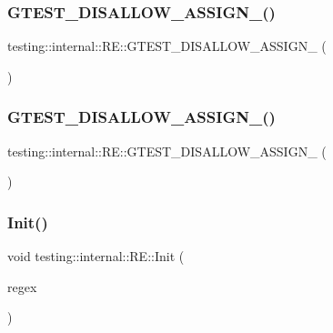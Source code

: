 \subsubsection{\texorpdfstring{GTEST\_DISALLOW\_ASSIGN\_()}{GTEST\_DISALLOW\_ASSIGN\_()}\hspace{0.1cm}{\footnotesize\ttfamily [2/3]}}
{\footnotesize\ttfamily testing\+::internal\+::\+R\+E\+::\+G\+T\+E\+S\+T\+\_\+\+D\+I\+S\+A\+L\+L\+O\+W\+\_\+\+A\+S\+S\+I\+G\+N\+\_\+ (\begin{DoxyParamCaption}\item[{\mbox{\hyperlink{classtesting_1_1internal_1_1_r_e}{RE}}}]{ }\end{DoxyParamCaption})\hspace{0.3cm}{\ttfamily [private]}}

\mbox{\label{classtesting_1_1internal_1_1_r_e_a6a07573fee776f88fe045d067dbebe18}} 
\subsubsection{\texorpdfstring{GTEST\_DISALLOW\_ASSIGN\_()}{GTEST\_DISALLOW\_ASSIGN\_()}\hspace{0.1cm}{\footnotesize\ttfamily [3/3]}}
{\footnotesize\ttfamily testing\+::internal\+::\+R\+E\+::\+G\+T\+E\+S\+T\+\_\+\+D\+I\+S\+A\+L\+L\+O\+W\+\_\+\+A\+S\+S\+I\+G\+N\+\_\+ (\begin{DoxyParamCaption}\item[{\mbox{\hyperlink{classtesting_1_1internal_1_1_r_e}{RE}}}]{ }\end{DoxyParamCaption})\hspace{0.3cm}{\ttfamily [private]}}

\mbox{\label{classtesting_1_1internal_1_1_r_e_a4c3a519ce849abc57d6d5fffbf1e04dc}} 
\subsubsection{\texorpdfstring{Init()}{Init()}\hspace{0.1cm}{\footnotesize\ttfamily [1/3]}}
{\footnotesize\ttfamily void testing\+::internal\+::\+R\+E\+::\+Init (\begin{DoxyParamCaption}\item[{const char $\ast$}]{regex }\end{DoxyParamCaption})\hspace{0.3cm}{\ttfamily [private]}}

